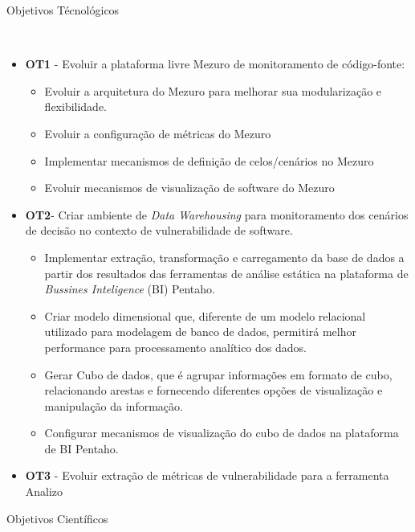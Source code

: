 %
\begin{description}
	\item [Objetivos Técnológicos]\
\end{description}
		\begin{itemize}
			\item \textbf{OT1} - Evoluir a plataforma livre Mezuro de monitoramento de código-fonte:
				\begin{itemize}
					\item Evoluir a arquitetura do Mezuro para melhorar sua modularização e flexibilidade.
					\item Evoluir a configuração de métricas do Mezuro
					\item Implementar mecanismos de definição de celos/cenários no Mezuro
					\item Evoluir mecanismos de visualização de software do Mezuro
				\end{itemize}

			\item \textbf{OT2}- Criar ambiente de \emph{Data Warehousing} para monitoramento dos cenários de decisão no contexto de vulnerabilidade de software.	
	        	\begin{itemize}
	        		\item Implementar extração, transformação e carregamento da base de dados a partir dos resultados das ferramentas de análise estática na plataforma de \emph{Bussines Inteligence} (BI) Pentaho.
	        		\item Criar modelo dimensional que, diferente de um modelo relacional utilizado para modelagem de banco de dados, permitirá melhor performance para processamento analítico dos dados.
	        		\item Gerar Cubo de dados, que é agrupar informações em formato de cubo, relacionando arestas e fornecendo diferentes opções de visualização e manipulação da informação.
					\item Configurar mecanismos de visualização do cubo de dados na plataforma de BI Pentaho.
	        	\end{itemize}
			\item \textbf{OT3} - Evoluir extração de métricas de vulnerabilidade para a ferramenta Analizo
		\end{itemize}
\begin{description}
	\item [Objetivos Científicos]\
\end{description}	
